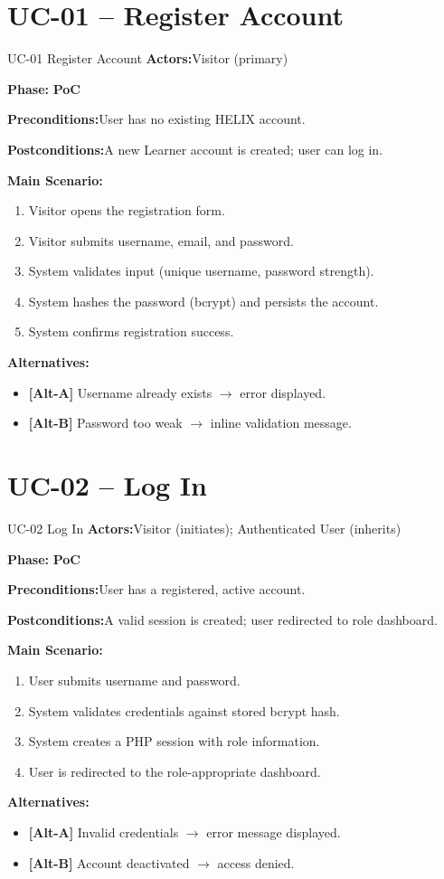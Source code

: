 \documentclass[12pt,a4paper]{report}
\newcommand{\ucfield}[2]{%
    \noindent\textbf{\color{helixpurplemid}#1:}\quad #2\par\medskip
}
\newcommand{\ucphase}[1]{%
    \noindent\textbf{\color{helixpurplemid}Phase:}\quad%
    \ifstrequal{#1}{PoC}{\textcolor{helixteal}{\textbf{PoC}}}{\textcolor{helixamber}{\textbf{Future MVP}}}%
    \par\medskip
}
\begin{document}
\section{UC-01 -- Register Account}
\begin{ucbox}{UC-01 \quad Register Account}
    \ucfield{Actors}{Visitor (primary)}
    \ucphase{PoC}
    \ucfield{Preconditions}{User has no existing HELIX account.}
    \ucfield{Postconditions}{A new Learner account is created; user can log in.}
    \textbf{\color{helixpurplemid}Main Scenario:}
    \begin{enumerate}
        \item Visitor opens the registration form.
        \item Visitor submits username, email, and password.
        \item System validates input (unique username, password strength).
        \item System hashes the password (bcrypt) and persists the account.
        \item System confirms registration success.
    \end{enumerate}
    \textbf{\color{helixpurplemid}Alternatives:}
    \begin{itemize}
        \item \textbf{[Alt-A]} Username already exists $\rightarrow$ error displayed.
        \item \textbf{[Alt-B]} Password too weak $\rightarrow$ inline validation message.
    \end{itemize}
\end{ucbox}

\section{UC-02 -- Log In}
\begin{ucbox}{UC-02 \quad Log In}
    \ucfield{Actors}{Visitor (initiates); Authenticated User (inherits)}
    \ucphase{PoC}
    \ucfield{Preconditions}{User has a registered, active account.}
    \ucfield{Postconditions}{A valid session is created; user redirected to role dashboard.}
    \textbf{\color{helixpurplemid}Main Scenario:}
    \begin{enumerate}
        \item User submits username and password.
        \item System validates credentials against stored bcrypt hash.
        \item System creates a PHP session with role information.
        \item User is redirected to the role-appropriate dashboard.
    \end{enumerate}
    \textbf{\color{helixpurplemid}Alternatives:}
    \begin{itemize}
        \item \textbf{[Alt-A]} Invalid credentials $\rightarrow$ error message displayed.
        \item \textbf{[Alt-B]} Account deactivated $\rightarrow$ access denied.
    \end{itemize}
\end{ucbox}
\end{document}

